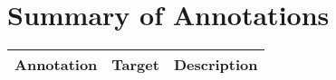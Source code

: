 \chapter{Summary of Annotations}
\label{annotation_table}
\begin{longtable}{|l|p{1.2in}|p{3.5in}|}
\hline
\bfseries Annotation & \bfseries Target & \bfseries Description \tabularnewline
\hline\hline\endhead
\end{longtable}

